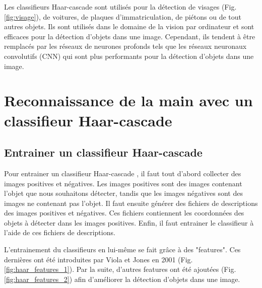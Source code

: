 \documentclass[11pt]{article}
\begin{document}
Les classifieurs Haar-cascade sont utilisés pour la détection de visages (Fig. \ref{fig:visage}), de voitures, de plaques d'immatriculation, de piétons ou de tout autres objets. Ils sont utilisés dans le domaine de la vision par ordinateur et sont efficaces pour la détection d'objets dans une image.
Cependant, ils tendent à être remplacés par les réseaux de neurones profonds tels que les réseaux neuronaux convolutifs (CNN) qui sont plus performants pour la détection d'objets dans une image.

\newpage

\section{Reconnaissance de la main avec un classifieur Haar-cascade}
\subsection{Entrainer un classifieur Haar-cascade}
Pour entrainer un classifieur Haar-cascade \cite{mittal_haar_2024}, il faut tout d'abord collecter des images positives et négatives. Les images positives sont des images contenant l'objet que nous souhaitons détecter, tandis que les images négatives sont des images ne contenant pas l'objet. Il faut ensuite générer des fichiers de descriptions des images positives et négatives. Ces fichiers contiennent les coordonnées des objets à détecter dans les images positives. Enfin, il faut entrainer le classifieur à l'aide de ces fichiers de descriptions. \bigbreak

L'entrainement du classifieurs en lui-même se fait grâce à des "features". Ces dernières ont été introduites par Viola et Jones en 2001 (Fig. \ref{fig:haar_features_1}). Par la suite, d'autres features ont été ajoutées (Fig. \ref{fig:haar_features_2}) afin d'améliorer la détection d'objets dans une image.
\bigbreak \bigbreak
\end{document}
